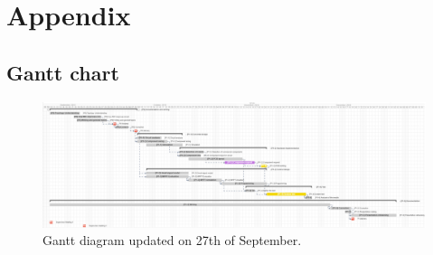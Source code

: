 \chapter{Appendix}




\begin{landscape}


\section{Gantt chart}


\vspace{2cm}
\begin{figure}[htbp]
	\begin{center}
		\includegraphics[trim = {0 0cm 0 0cm}, clip, width=1.6\textwidth]{../Pictures/Gantt_diagram_without_left_panel}
		\caption{Gantt diagram updated on 27th of September.}
		\label{gantt}
	\end{center}	
\end{figure}

\end{landscape}

